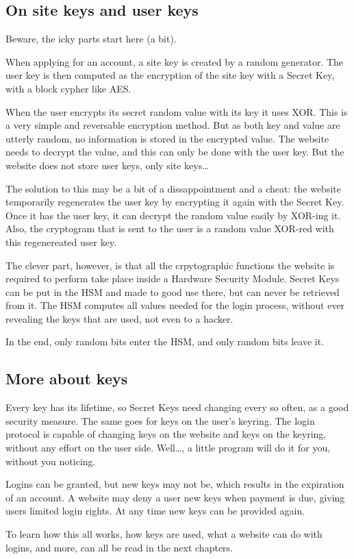 \subsection{On site keys and user keys}
Beware, the icky parts start here (a bit).
\par
When applying for an account, a site key is created by a random generator.
The user key is then computed as the encryption of the site key with a Secret Key, with a block cypher like AES.
\par
When the user encrypts its secret random value with its key it uses XOR.
This is a very simple and reversable encryption method.
But as both key and value are utterly random, no information is stored in the encrypted value.
The website needs to decrypt the value, and this can only be done with the user key.
But the website does not store user keys, only site keys\ldots
\par
The solution to this may be a bit of a dissappointment and a cheat:
the website temporarily regenerates the user key by encrypting it again with the Secret Key.
Once it has the user key, it can decrypt the random value easily by XOR-ing it.
Also, the cryptogram that is sent to the user is a random value XOR-red with this regenereated user key.
\par
The clever part, however, is that all the crpytographic functions the website is required to perform take place inside a Hardware Security Module.
Secret Keys can be put in the HSM and made to good use there, but can never be retrieved from it.
The HSM computes all values needed for the login process,
without ever revealing the keys that are used, not even to a hacker.
\par
In the end,
only random bits enter the HSM,
and only random bits leave it.
\subsection{More about keys}
Every key has its lifetime, so Secret Keys need changing every so often, as a good security measure.
The same goes for keys on the user's keyring.
The login protocol is capable of changing keys on the website and keys on the keyring,
without any effort on the user side.
Well\ldots, a little program will do it for you, without you noticing.
\par
Logins can be granted,
but new keys may not be,
which results in the expiration of an account.
A website may deny a user new keys when payment is due,
giving users limited login rights.
At any time new keys can be provided again.
\par
\par
To learn how this all works,
how keys are used,
what a website can do with logins,
and more,
can all be read in the next chapters.
